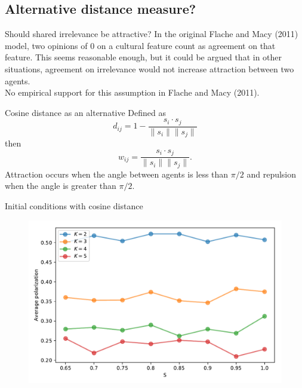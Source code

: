 \documentclass[11pt]{beamer}
\begin{document}
\subsection{Alternative distance measure?}

\begin{frame}{Should shared irrelevance be attractive?}
  In the original Flache and Macy (2011) model, two opinions of 0 on a
  cultural feature count as agreement on that feature. This seems reasonable
  enough, but it could be argued that in other situations, agreement on
  irrelevance would not increase attraction between two agents.
  \\[1em]
  No empirical support for this assumption in Flache and Macy (2011).
\end{frame}

\begin{frame}{Cosine distance as an alternative}
  Defined as 
  \[
    d_{ij} = 1 - \frac{s_i \cdot s_j}{\lVert s_i \rVert \lVert s_j \rVert}
  \]
  then
  \[
    w_{ij} = \frac{s_i \cdot s_j}{\lVert s_i \rVert \lVert s_j \rVert}.
  \]
  Attraction occurs when the angle between agents is less than $\pi/2$ and
  repulsion when the angle is greater than $\pi / 2$.
\end{frame}

\begin{frame}{Initial conditions with cosine distance}
  \begin{figure}
    \centering
    \includegraphics[width=\textwidth]{Figures/P_vs_S_for_K_cosine.pdf}
    \label{fig:p_vs_s_for_k}
  \end{figure}
\end{frame}
\end{document}

